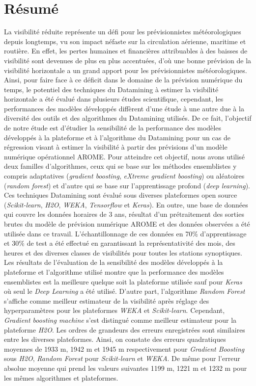 \chapter*{Résumé}
\mtcaddchapter[Résumé]
\label{chap:abstract_fr}
La visibilité réduite représente un défi pour les prévisionnistes météorologiques depuis longtemps, vu son impact néfaste sur la circulation aérienne, maritime et routière. En effet, les pertes humaines et financières attribuables à des baisses de visibilité sont devenues de plus en plus accentuées, d'où une bonne prévision de la visibilité horizontale a un grand apport pour les prévisionnistes météorologiques. Ainsi, pour faire face à ce déficit dans le domaine de la prévision numérique du temps, le potentiel des techniques du Datamining à estimer la visibilité horizontale a été évalué dans plusieurs études scientifique, cependant, les performances des modèles développés diffèrent d'une étude à une autre due à la diversité des outils et des algorithmes du Datamining utilisés. De ce fait, l'objectif de notre étude est d'étudier la sensibilité de la performance des modèles développés à la plateforme et à l'algorithme du Datamining pour un cas de régression visant à estimer la visibilité à partir des prévisions d'un modèle numérique opérationnel AROME.
Pour atteindre cet objectif, nous avons utilisé deux familles d'algorithmes, ceux qui se base sur les méthodes ensemblistes y compris adaptatives (\textit{gradient boosting}, \textit{eXtreme gradient boosting}) ou aléatoires (\textit{random forest}) et d'autre qui se base sur l'apprentissage profond (\textit{deep learning}). Ces techniques Datamining sont évalué sous diverses plateformes open source (\textit{Scikit-learn}, \textit{H2O}, \textit{WEKA}, \textit{Tensorflow} et \textit{Keras}). En outre, une base de données qui couvre les données horaires de 3 ans, résultat d’un prétraitement des sorties brutes du modèle de prévision numérique AROME et des données observées a été utilisée dans ce travail. L’échantillonnage  de  ces  données  en  70\% d'apprentissage et 30\% de test  a été effectué en garantissant la représentativité des mois, des heures et des diverses classes de visibilités pour toutes les stations synoptiques. Les résultats de l'évaluation de la sensibilité des modèles développés à la plateforme et l'algorithme utilisé montre que la performance des modèles ensemblistes est la meilleure quelque soit la plateforme utilisée sauf pour \textit{Keras} où seul le \textit{Deep Learning} a été utilisé. D'autre part, l’algorithme \textit{Random Forest} s’affiche comme meilleur estimateur de la visibilité après réglage des hyperparamètres pour les plateformes \textit{WEKA} et \textit{Scikit-learn}. Cependant, \textit{Gradient boosting machine} s’est distingué comme meilleur estimateur pour la plateforme \textit{H2O}. Les ordres de grandeurs des erreurs enregistrées sont similaires entre les diverses plateformes. Ainsi, on constate des erreurs quadratiques moyennes de 1933 m, 1942 m et 1945 m respectivement pour \textit{Gradient Boosting} sous \textit{H2O}, \textit{Random Forest} pour \textit{Scikit-learn} et \textit{WEKA}. De même pour l’erreur absolue moyenne qui prend les valeurs suivantes 1199 m, 1221 m et 1232 m pour les mêmes algorithmes et plateformes.
